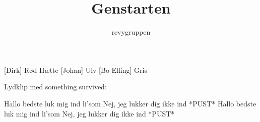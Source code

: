 \documentclass[a4paper,11pt]{article}
\title{Genstarten}
\author{revygruppen}
\begin{document}
\maketitle

\begin{roles}
[Dirk] Rød Hætte
[Johan] Ulv
[Bo Elling] Gris
\end{roles}
  
\begin{sketch}
Lydklip med something survived:

 Hallo bedste luk mig ind li'som
 Nej, jeg lukker dig ikke ind
 *PUST*
 Hallo bedste luk mig ind li'som
 Nej, jeg lukker dig ikke ind
 *PUST*


\end{sketch}
\end{document}
